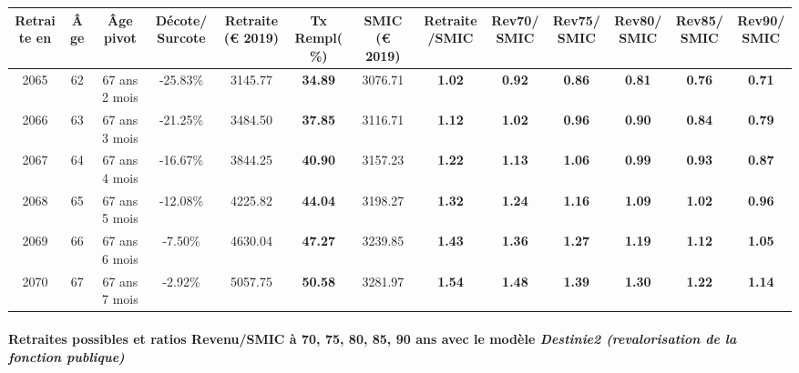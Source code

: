 { \scriptsize \begin{center} 
\begin{tabular}[htb]{|c|c||c|c||c|c||c||c|c|c|c|c|c|} 
\hline 
 Retraite en &  Âge &  Âge pivot &  Décote/Surcote &  Retraite (\euro{} 2019) &  Tx Rempl(\%) &  SMIC (\euro{} 2019) &  Retraite/SMIC &  Rev70/SMIC &  Rev75/SMIC &  Rev80/SMIC &  Rev85/SMIC &  Rev90/SMIC \\ 
\hline \hline 
 2065 &  62 &  67 ans 2 mois &  -25.83\% &  3145.77 &  {\bf 34.89} &  3076.71 &  {\bf 1.02} &  {\bf {\color{red} 0.92}} &  {\bf {\color{red} 0.86}} &  {\bf {\color{red} 0.81}} &  {\bf {\color{red} 0.76}} &  {\bf {\color{red} 0.71}} \\ 
\hline 
 2066 &  63 &  67 ans 3 mois &  -21.25\% &  3484.50 &  {\bf 37.85} &  3116.71 &  {\bf 1.12} &  {\bf 1.02} &  {\bf {\color{red} 0.96}} &  {\bf {\color{red} 0.90}} &  {\bf {\color{red} 0.84}} &  {\bf {\color{red} 0.79}} \\ 
\hline 
 2067 &  64 &  67 ans 4 mois &  -16.67\% &  3844.25 &  {\bf 40.90} &  3157.23 &  {\bf 1.22} &  {\bf 1.13} &  {\bf 1.06} &  {\bf {\color{red} 0.99}} &  {\bf {\color{red} 0.93}} &  {\bf {\color{red} 0.87}} \\ 
\hline 
 2068 &  65 &  67 ans 5 mois &  -12.08\% &  4225.82 &  {\bf 44.04} &  3198.27 &  {\bf 1.32} &  {\bf 1.24} &  {\bf 1.16} &  {\bf 1.09} &  {\bf 1.02} &  {\bf {\color{red} 0.96}} \\ 
\hline 
 2069 &  66 &  67 ans 6 mois &  -7.50\% &  4630.04 &  {\bf 47.27} &  3239.85 &  {\bf 1.43} &  {\bf 1.36} &  {\bf 1.27} &  {\bf 1.19} &  {\bf 1.12} &  {\bf 1.05} \\ 
\hline 
 2070 &  67 &  67 ans 7 mois &  -2.92\% &  5057.75 &  {\bf 50.58} &  3281.97 &  {\bf 1.54} &  {\bf 1.48} &  {\bf 1.39} &  {\bf 1.30} &  {\bf 1.22} &  {\bf 1.14} \\ 
\hline 
\hline 
\end{tabular} 
\end{center} } 
\paragraph{Retraites possibles et ratios Revenu/SMIC à 70, 75, 80, 85, 90 ans avec le modèle \emph{Destinie2 (revalorisation de la fonction publique)}}  
 
